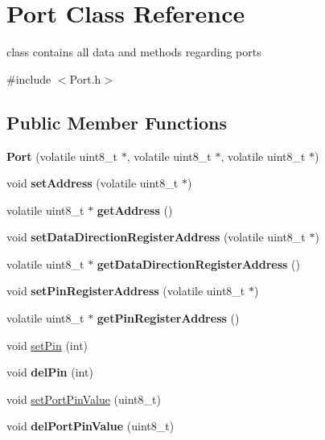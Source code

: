 \hypertarget{class_port}{}\section{Port Class Reference}
\label{class_port}


class contains all data and methods regarding ports  




{\ttfamily \#include $<$Port.\+h$>$}

\subsection*{Public Member Functions}
\begin{DoxyCompactItemize}
\item 
\mbox{\label{class_port_a936be042f6aa3f3c76781d6691e76169}} 
{\bfseries Port} (volatile uint8\+\_\+t $\ast$, volatile uint8\+\_\+t $\ast$, volatile uint8\+\_\+t $\ast$)
\item 
\mbox{\label{class_port_a056364375394f2ac252729b187929448}} 
void {\bfseries set\+Address} (volatile uint8\+\_\+t $\ast$)
\item 
\mbox{\label{class_port_ad2744204bd48126879f702ea22afa4df}} 
volatile uint8\+\_\+t $\ast$ {\bfseries get\+Address} ()
\item 
\mbox{\label{class_port_a3fab02209984e790288f2de2a55cc61f}} 
void {\bfseries set\+Data\+Direction\+Register\+Address} (volatile uint8\+\_\+t $\ast$)
\item 
\mbox{\label{class_port_af840d672c079ab0c0cee5fe4a7083e00}} 
volatile uint8\+\_\+t $\ast$ {\bfseries get\+Data\+Direction\+Register\+Address} ()
\item 
\mbox{\label{class_port_ad86e468f0289411c7c90d7f120bf26ef}} 
void {\bfseries set\+Pin\+Register\+Address} (volatile uint8\+\_\+t $\ast$)
\item 
\mbox{\label{class_port_ae0a5bf75eefa3ed2d4d42d06f7951a3f}} 
volatile uint8\+\_\+t $\ast$ {\bfseries get\+Pin\+Register\+Address} ()
\item 
void \mbox{\hyperlink{class_port_a8fe1b4494cbebd660d2e0d306d375955}{set\+Pin}} (int)
\item 
\mbox{\label{class_port_aec1b820881dac4fd56a21d88154c83e5}} 
void {\bfseries del\+Pin} (int)
\item 
void \mbox{\hyperlink{class_port_a4bcf1fdd0aa8221dc05b3d2665ecd292}{set\+Port\+Pin\+Value}} (uint8\+\_\+t)
\item 
\mbox{\label{class_port_a258691606dfcce003f4ddc9f1677e00a}} 
void {\bfseries del\+Port\+Pin\+Value} (uint8\+\_\+t)
\end{DoxyCompactItemize}


